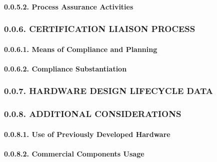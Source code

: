 \documentclass[
]{article}
\begin{document}
\hypertarget{process-assurance-activities}{%
\paragraph{0.0.5.2. Process Assurance
Activities}\label{process-assurance-activities}}

\hypertarget{certification-liaison-process}{%
\subsubsection{0.0.6. CERTIFICATION LIAISON
PROCESS}\label{certification-liaison-process}}

\hypertarget{means-of-compliance-and-planning}{%
\paragraph{0.0.6.1. Means of Compliance and
Planning}\label{means-of-compliance-and-planning}}

\hypertarget{compliance-substantiation}{%
\paragraph{0.0.6.2. Compliance
Substantiation}\label{compliance-substantiation}}

\hypertarget{hardware-design-lifecycle-data}{%
\subsubsection{0.0.7. HARDWARE DESIGN LIFECYCLE
DATA}\label{hardware-design-lifecycle-data}}

\hypertarget{additional-considerations}{%
\subsubsection{0.0.8. ADDITIONAL
CONSIDERATIONS}\label{additional-considerations}}

\hypertarget{use-of-previously-developed-hardware}{%
\paragraph{0.0.8.1. Use of Previously Developed
Hardware}\label{use-of-previously-developed-hardware}}

\hypertarget{commercial-components-usage}{%
\paragraph{0.0.8.2. Commercial Components
Usage}\label{commercial-components-usage}}
\end{document}
